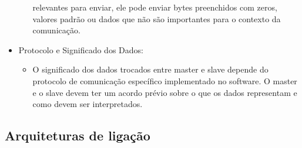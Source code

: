 \documentclass[a4paper, 12pt, onecolumn, twoside]{article}
\begin{document}
\begin{itemize}
\begin{itemize}
        relevantes para enviar, ele pode enviar bytes preenchidos com zeros, valores padrão ou dados que não 
        são importantes para o contexto da comunicação.
    \end{itemize}
    \item Protocolo e Significado dos Dados:
    \begin{itemize}
        \item O significado dos dados trocados entre master e slave depende do protocolo de comunicação específico 
        implementado no software. O master e o slave devem ter um acordo prévio sobre o que os dados representam e 
        como devem ser interpretados.
    \end{itemize}
\end{itemize}

\clearpage
\subsection{Arquiteturas de ligação}
\end{document}

